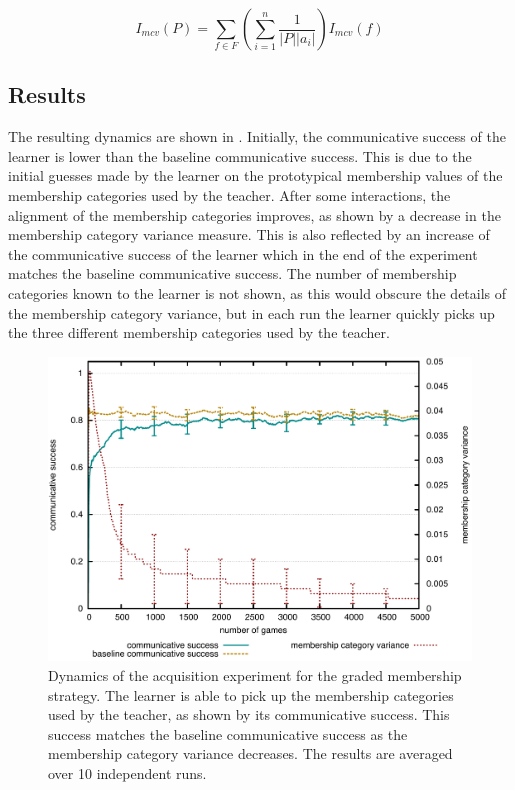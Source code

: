 \begin{equation}
  I_{mcv}(P) = \sum_{f \in F} \left(\sum_{i=1}^{n} \frac{1}{|P||a_i|}\right) I_{mcv}(f)
\label{eq:mcv-population}
\end{equation}

\subsection{Results}

The resulting dynamics are shown in . Initially, the communicative success
of the learner is lower than the baseline communicative success. This is due to the
initial guesses made by the learner on the prototypical membership values of the 
membership categories used by the teacher. After some interactions, the
alignment of the membership categories improves, as shown by a
decrease in the membership category variance measure. This is
also reflected by an increase of the communicative success of the learner
which in the end of the experiment matches the baseline communicative
success. The number of membership categories known to the learner is
not shown, as this would obscure the details of the membership
category variance, but in each run the learner quickly picks up the three different
membership categories used by the teacher.

\begin{figure}[htpb]
  \begin{center}
    \includegraphics[width=.8\textwidth]{./graded-membership/figures/strict-acquisition.pdf}
    \caption[Dynamics of the acquisition experiment for the graded
    membership strategy]{Dynamics of the acquisition experiment for
      the graded membership strategy. The learner is able to pick up
      the membership categories used by the teacher, as shown by its
      communicative success. This success matches the baseline communicative
      success as the membership category variance decreases. The
      results are averaged over 10 independent runs.}
    \label{f:gm-acquisition-dynamics}
  \end{center}
\end{figure}

